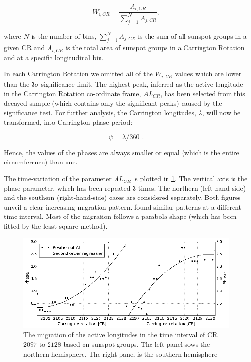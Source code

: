 \begin{equation}
W_{i,CR} = \frac{A_{i,CR}}{ \sum_{j=1}^{N} A_{j,CR} },
\end{equation}

where $N$ is the number of bins, $\sum_{j=1}^{N} A_{j,CR}$  is the sum of all sunspot groups in a given CR and $A_{i,CR}$ is the  total area of sunspot groups in a Carrington Rotation and at a specific longitudinal bin.

In each Carrington Rotation we omitted all of the $ W_{i,CR}$ values which are lower than the $3\sigma$ significance limit.
The highest peak, inferred as the active longitude in the Carrington Rotation co-ordinate frame, $AL_{CR}$, has been selected from this decayed sample (which contains only the significant peaks) caused by the significance test.
For further analysis, the Carrington longitudes, $\lambda$, will now be transformed, into Carrington phase period: 

\begin{equation}
\psi = \lambda/360^{\circ}.
\end{equation}

Hence, the values of the phases are always smaller or equal (which is the entire circumference) than one. 

The time-variation of the parameter $AL_{CR}$ is plotted in \cref{AL}.
The vertical axis is the phase parameter, which has been repeated $3$ times.
The northern (left-hand-side) and the southern (right-hand-side) cases are considered separately. Both figures unveil a clear increasing migration pattern. \cite{Usoskin2005,Gyenge2014} found similar patterns at a different time interval. Most of the migration follows a parabola shape (which has been fitted by the least-square method).

\begin{figure}
	\centering
	\includegraphics[width=128mm]{Chapter4/Figs/AL}
	\caption{The migration of the active longitudes in the time interval of CR $2097$ to $2128$ based on sunspot groups. The left panel sows the northern hemisphere. The right panel is the southern hemisphere.}
	\label{AL}
\end{figure}

